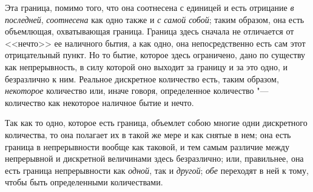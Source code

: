 Эта граница, помимо того, что она соотнесена с единицей и есть отрицание
{\em в последней}, {\em соотнесена}
как одно также и {\em с самой собой}; таким образом,
она есть объемлющая, охватывающая граница. Граница здесь сначала не
отличается от <<нечто>> ее наличного бытия, а как одно, она непосредственно
есть сам этот отрицательный пункт. Но то бытие, которое здесь ограничено,
дано по существу как непрерывность, в силу которой оно выходит за границу и
за это одно, и безразлично к ним. Реальное дискретное количество есть,
таким образом, {\em некоторое} количество или, иначе говоря, определенное
количество "--- количество как некоторое наличное бытие и нечто.

Так как то одно, которое есть граница, объемлет собою многие одни
дискретного количества, то она полагает их в такой же мере и как снятые в
нем; она есть граница в непрерывности вообще как таковой, и тем самым
различие между непрерывной и дискретной величинами здесь безразлично; или,
правильнее, она есть граница непрерывности как
{\em одной}, так и {\em другой}; {\em обе} переходят в ней
к тому, чтобы быть определенными количествами.

\bigskip
